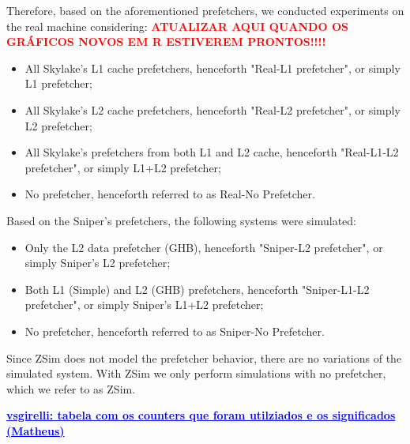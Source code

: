 \documentclass[AMA,final,STIX1COL]{WileyNJD-v2}
\newcommand{\vsg}[1]{\textcolor{blue}{\bfseries \ul{vsgirelli: #1} }\vspace{0.2cm}}
\begin{document}
Therefore, based on the aforementioned prefetchers, we conducted experiments on the real machine considering: \textcolor{red}{\textbf{ATUALIZAR AQUI QUANDO OS GRÁFICOS NOVOS EM R ESTIVEREM PRONTOS!!!!}}
\begin{itemize}
    \item All Skylake's L1 cache prefetchers, henceforth "Real-L1 prefetcher", or simply L1 prefetcher;
    \item All Skylake's L2 cache prefetchers, henceforth "Real-L2 prefetcher", or simply L2 prefetcher;
    \item All Skylake's prefetchers from both L1 and L2 cache, henceforth "Real-L1-L2 prefetcher", or simply L1+L2 prefetcher;
    \item No prefetcher, henceforth referred to as Real-No Prefetcher.
\end{itemize}

Based on the Sniper's prefetchers, the following systems were simulated:
\begin{itemize}
    \item Only the L2 data prefetcher (GHB), henceforth "Sniper-L2 prefetcher", or simply Sniper's L2 prefetcher;
    \item Both L1 (Simple) and L2 (GHB) prefetchers, henceforth "Sniper-L1-L2 prefetcher", or simply Sniper's L1+L2 prefetcher;
    \item No prefetcher, henceforth referred to as Sniper-No Prefetcher.
\end{itemize}

Since ZSim does not model the prefetcher behavior, there are no variations of the simulated system. With ZSim we only perform simulations with no prefetcher, which we refer to as ZSim.


\vsg{tabela com os counters que foram utilziados e os significados (Matheus)}
\end{document}
